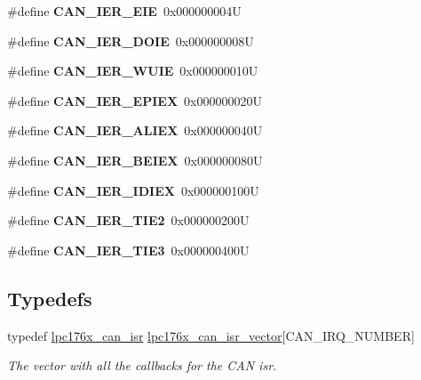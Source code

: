 \begin{DoxyCompactItemize}
\mbox{\label{can-defs_8h_a7c5a45cabe99423ecbbd05df116dad20}} 
\#define {\bfseries C\+A\+N\+\_\+\+I\+E\+R\+\_\+\+E\+IE}~0x000000004U
\item 
\mbox{\label{can-defs_8h_a0040248415efe4811e416b4265873a70}} 
\#define {\bfseries C\+A\+N\+\_\+\+I\+E\+R\+\_\+\+D\+O\+IE}~0x000000008U
\item 
\mbox{\label{can-defs_8h_ad9eff97f356d550aa52f0545e3c459d2}} 
\#define {\bfseries C\+A\+N\+\_\+\+I\+E\+R\+\_\+\+W\+U\+IE}~0x000000010U
\item 
\mbox{\label{can-defs_8h_abbf7ddaf78dae2d497bdb68ec1981c5d}} 
\#define {\bfseries C\+A\+N\+\_\+\+I\+E\+R\+\_\+\+E\+P\+I\+EX}~0x000000020U
\item 
\mbox{\label{can-defs_8h_a4cf47c2198c3089a44d6e04f1db76ea3}} 
\#define {\bfseries C\+A\+N\+\_\+\+I\+E\+R\+\_\+\+A\+L\+I\+EX}~0x000000040U
\item 
\mbox{\label{can-defs_8h_aa6f3b9451fa60b4ffdac7d3724833c92}} 
\#define {\bfseries C\+A\+N\+\_\+\+I\+E\+R\+\_\+\+B\+E\+I\+EX}~0x000000080U
\item 
\mbox{\label{can-defs_8h_a39326f2a46de239f2fbe48b7a8282d8e}} 
\#define {\bfseries C\+A\+N\+\_\+\+I\+E\+R\+\_\+\+I\+D\+I\+EX}~0x000000100U
\item 
\mbox{\label{can-defs_8h_a8168f7849c90eae9dae59835aac5fef8}} 
\#define {\bfseries C\+A\+N\+\_\+\+I\+E\+R\+\_\+\+T\+I\+E2}~0x000000200U
\item 
\mbox{\label{can-defs_8h_a4d555856f1c80fe21c7fbd0858ec2118}} 
\#define {\bfseries C\+A\+N\+\_\+\+I\+E\+R\+\_\+\+T\+I\+E3}~0x000000400U
\end{DoxyCompactItemize}
\subsection*{Typedefs}
\begin{DoxyCompactItemize}
\item 
\mbox{\label{can-defs_8h_a6e2fd9a66aef933e66829de79bda2b4d}} 
typedef \mbox{\hyperlink{can_8h_aa87a69bb1a8f612d67c7f50ddd466f79}{lpc176x\+\_\+can\+\_\+isr}} \mbox{\hyperlink{can-defs_8h_a6e2fd9a66aef933e66829de79bda2b4d}{lpc176x\+\_\+can\+\_\+isr\+\_\+vector}}\mbox{[}C\+A\+N\+\_\+\+I\+R\+Q\+\_\+\+N\+U\+M\+B\+ER\mbox{]}
\begin{DoxyCompactList}\small\item\em The vector with all the callbacks for the C\+AN isr. \end{DoxyCompactList}\end{DoxyCompactItemize}
